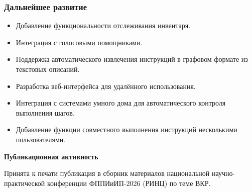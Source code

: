 \documentclass{beamer}
\begin{document}
\begin{frame}
    \frametitle{Дальнейшее развитие}
    \vspace{-0.5cm}
    \begin{itemize}
        \item[---] Добавление функциональности отслеживания инвентаря.
        \item[---] Интеграция с голосовыми помощниками.
        \item[---] Поддержка автоматического извлечения инструкций в графовом формате из текстовых описаний.
        \item[---] Разработка веб-интерфейса для удалённого использования.
        \item[---] Интеграция с системами умного дома для автоматического контроля выполнения шагов.
        \item[---] Добавление функции совместного выполнения инструкций несколькими пользователями.
    \end{itemize}
    \vspace{0.3cm}
    \begin{center}
        \large \textbf{Публикационная активность}
    \end{center}

    \noindent Принята к печати публикация в сборник материалов национальной научно-практической конференции ФППИиИП-2026 (РИНЦ) по теме ВКР.
\end{frame}
\end{document}

